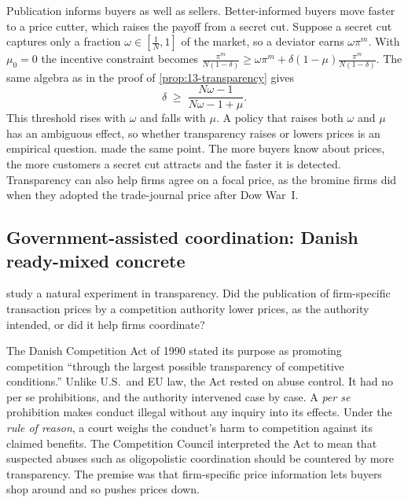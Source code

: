 \begin{remark}\label{rem:13-transparency-buyers}
Publication informs buyers as well as sellers. Better-informed buyers move faster to a price cutter, which raises
the payoff from a secret cut. Suppose a secret cut captures only a fraction $\omega \in [\frac{1}{N}, 1]$ of the
market, so a deviator earns $\omega\pi^m$. With $\mu_0 = 0$ the incentive constraint becomes
$\frac{\pi^m}{N(1-\delta)} \ge \omega\pi^m + \delta(1-\mu)\frac{\pi^m}{N(1-\delta)}$. The same algebra as in the
proof of \cref{prop:13-transparency} gives
\begin{equation*}
  \delta \;\ge\; \frac{N\omega - 1}{N\omega - 1 + \mu} .
\end{equation*}
This threshold rises with $\omega$ and falls with $\mu$. A policy that raises both $\omega$ and $\mu$ has an
ambiguous effect, so whether transparency raises or lowers prices is an empirical question.
\citet{Stigler1964} made the same point. The more buyers know about prices, the more customers a secret cut
attracts and the faster it is detected. Transparency can also help firms agree on a focal price, as the bromine
firms did when they adopted the trade-journal price after Dow War~I.
\end{remark}

\subsection{Government-assisted coordination: Danish ready-mixed concrete}\label{sec:13-concrete}

\citet{AlbaekMollgaardOvergaard1997} study a natural experiment in transparency. Did the publication of
firm-specific transaction prices by a competition authority lower prices, as the authority intended, or did it
help firms coordinate?

The Danish Competition Act of 1990 stated its purpose as promoting competition ``through the largest possible
transparency of competitive conditions.'' Unlike U.S.\ and EU law, the Act rested on abuse control. It had no per
se prohibitions, and the authority intervened case by case. A \emph{per se} prohibition makes conduct illegal
without any inquiry into its effects. Under the \emph{rule of reason}, a court weighs the conduct's harm to
competition against its claimed benefits. The Competition Council interpreted the Act to mean
that suspected abuses such as oligopolistic coordination should be countered by more transparency. The premise
was that firm-specific price information lets buyers shop around and so pushes prices down.

